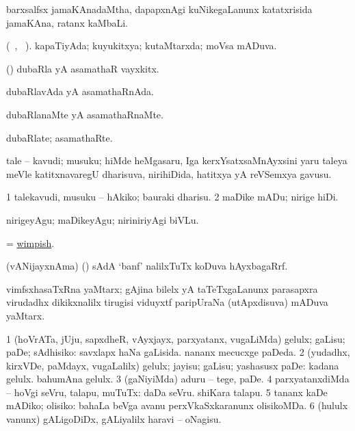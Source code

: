 \bentry
{}
\gl{\nA}
\bmng
barxsalfsx jamaKAnadaMtha, dapapxnAgi kuNikegaLanunx katatxrisida jamaKAna, ratanx kaMbaLi. 
\emng
\eentry

\bentry
{}
\gl{\saMkiSx}
\bmng
{} 
\emng
\eentry

\bentry
{}
\gl{\gu} (\tara\ , \tama\ ).
\bmng
kapaTiyAda; kuyukitxya; kutaMtarxda; moVsa mADuva. 
\emng
\eentry

\bentry
{}
\gl{\nA}
\bmng
(\AmA) dubaRla yA asamathaR vayxkitx. 
\emng
\eentry

\bentry
{}
\gl{\gu}
\bmng
dubaRlavAda yA asamathaRnAda. 
\emng
\eentry

\bentry
{}
\gl{\kirxvi}
\bmng
dubaRlanaMte yA asamathaRnaMte. 
\emng
\eentry

\bentry
{}
\gl{\nA}
\bmng
dubaRlate; asamathaRte. 
\emng
\eentry

\bentry
{} 
\gl{\nA}
\expl{}
\bmng
tale -- kavudi; musuku; hiMde heMgasaru, Iga kerxYsatxsaMnAyxsini yaru taleya meVle katitxnavaregU dharisuva, nirihiDida, hatitxya yA reVSemxya gavusu. 
\emng
\eentry

\bentry
{} 
\gl{\sakirx}
\expl{}
\bmng
\bnum
\num{1} talekavudi, musuku -- hAkiko; bauraki dharisu. 
\num{2} maDike mADu; nirige hiDi. 
\enum
\emng

\noindent 
\gl{\akirx}
\expl{}
\bmng
nirigeyAgu; maDikeyAgu; niriniriyAgi biVLu. 
\emng
\eentry

\bentry
{} 
\gl{\gu}
\expl{}
\bmng
= \hyperlink{wimpish}{wimpish}. 
\emng
\eentry

\bentry
{} 
\gl{\nA}
\bmng
(vANijayxnAma) (\AmA) sAdA `banf' nalilxTuTx koDuva hAyxbagaRrf. 
\emng
\eentry

\bentry
{} 
\gl{\nA}
\bmng
vimfsxhasaTxRna yaMtarx; gAjina bilelx yA taTeTxgaLanunx parasapxra virudadhx dikikxnalilx tirugisi viduyxtf paripUraNa (utApxdisuva) mADuva yaMtarx. 
\emng
\eentry

\bentry
{} 
\gl{\sakirx}
\expl{}
\bmng
\bnum
\num{1} (hoVrATa, jUju, sapxdheR, vAyxjayx, parxyatanx, \mo vugaLiMda) gelulx; gaLisu; paDe; sAdhisiko:  savxlapx haNa gaLisida.  nananx mecucxge paDeda. 
\num{2} (yudadhx, kirxVDe, paMdayx, \mo vugaLalilx) gelulx; jayisu; gaLisu; yashasusx paDe:  kadana gelulx.  bahumAna gelulx. 
\num{3} (gaNiyiMda) aduru -- tege, paDe. 
\num{4} parxyatanxdiMda -- hoVgi seVru, talapu, muTuTx:  daDa seVru.  shiKara talapu. 
\num{5} tananx kaDe mADiko; olisiko:  bahaLa beVga avanu perxVkaSxkaranunx olisikoMDa. 
\num{6} (hululx \mo vanunx) gALigoDiDx, gALiyalilx haravi -- oNagisu. 
\enum
\emng

